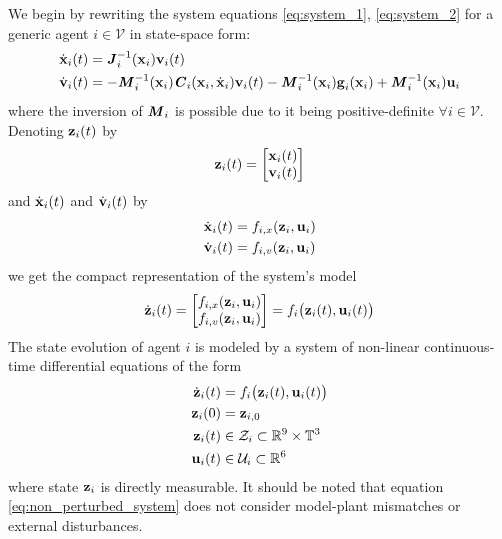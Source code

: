 We begin by rewriting the system equations \eqref{eq:system_1},
\eqref{eq:system_2} for a generic agent $i \in \mathcal{V}$ in state-space form:
\begin{subequations}
\begin{align}
  \dot{\bm{\mathbf{x}}}_i(t) &= \bm{\mathit{J}}_i^{-1}(\bm{\mathbf{x}}_i) \bm{\mathbf{v}}_i(t) \\
  \dot{\bm{\mathbf{v}}}_i(t) &= -\bm{\mathit{M}}_i^{-1}(\bm{\mathbf{x}}_i)\bm{\mathit{C}}_i(\bm{\mathbf{x}}_i,\dot{\bm{\mathbf{x}}}_i) \bm{\mathbf{v}}_i(t)
    - \bm{\mathit{M}}_i^{-1}(\bm{\mathbf{x}}_i)\bm{\mathbf{g}}_i(\bm{\mathbf{x}}_i)
    + \bm{\mathit{M}}_i^{-1}(\bm{\mathbf{x}}_i)\bm{\mathbf{u}}_i
\end{align}
\label{eq:state_space_system}
\end{subequations}
where the inversion of $\bm{\mathit{M}}_i$ is possible due to it being
positive-definite $\forall i \in \mathcal{V}$. Denoting $\bm{\mathbf{z}}_i(t)$ by
\begin{align}
  \bm{\mathbf{z}}_i(t) =
    \begin{bmatrix}
      \bm{\mathbf{x}}_i(t) \\
      \bm{\mathbf{v}}_i(t) \\
    \end{bmatrix}
\end{align}
and
$\dot{\bm{\mathbf{x}}}_i(t)$ and $\dot{\bm{\mathbf{v}}}_i(t)$ by
\begin{subequations}
\begin{align}
  \dot{\bm{\mathbf{x}}}_i(t) &= f_{i,x}(\bm{\mathbf{z}}_i, \bm{\mathbf{u}}_i) \\
  \dot{\bm{\mathbf{v}}}_i(t) &= f_{i,v}(\bm{\mathbf{z}}_i, \bm{\mathbf{u}}_i)
\end{align}
\end{subequations}
we get the compact representation of the system's model
\begin{align}
  \dot{\bm{\mathbf{z}}}_i(t) =
    \begin{bmatrix}
      f_{i,x}(\bm{\mathbf{z}}_i, \bm{\mathbf{u}}_i) \\
      f_{i,v}(\bm{\mathbf{z}}_i, \bm{\mathbf{u}}_i) \\
    \end{bmatrix} =
 f_i \big(\bm{\mathbf{z}}_i (t), \bm{\mathbf{u}}_i (t)\big)
\end{align}
The state evolution of agent $i$ is modeled by a system of non-linear
continuous-time differential equations of the form
\begin{align}
  \dot{\bm{\mathbf{z}}}_i(t) &= f_i \big(\bm{\mathbf{z}}_i (t), \bm{\mathbf{u}}_i (t)\big) \label{eq:non_perturbed_system}\\
  \bm{\mathbf{z}}_i(0) &= \bm{\mathbf{z}}_{i,0} \\
  \bm{\mathbf{z}}_i (t) & \in \mathcal{Z}_i \subset \mathbb{R}^{9} \times \mathbb{T}^3 \\
  \bm{\mathbf{u}}_i (t) & \in \mathcal{U}_i \subset \mathbb{R}^6
\end{align}
where state $\bm{\mathbf{z}}_i$ is directly measurable. It should be noted that
equation \eqref{eq:non_perturbed_system} does not consider model-plant
mismatches or external disturbances.

